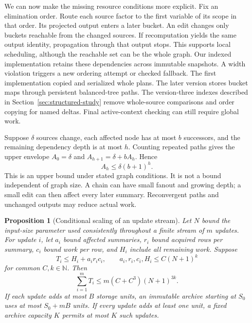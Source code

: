 \documentclass[11pt,a4paper]{article}
\numberwithin{equation}{section}
\theoremstyle{plain}
\newtheorem{proposition}[lemma]{Proposition}
\theoremstyle{definition}
\theoremstyle{remark}
\begin{document}
We can now make the missing resource conditions more explicit. Fix an elimination order. Route each source factor to the first variable of its scope in that order. Its projected output enters a later bucket. An edit changes only buckets reachable from the changed sources. If recomputation yields the same output identity, propagation through that output stops. This supports local scheduling, although the reachable set can be the whole graph. Our indexed implementation retains these dependencies across immutable snapshots. A width violation triggers a new ordering attempt or checked fallback. The first implementation copied and serialized whole plans. The later version stores bucket maps through persistent balanced-tree paths. The version-three indexes described in Section~\ref{sec:structured-study} remove whole-source comparisons and order copying for named deltas. Final active-context checking can still require global work.

Suppose $\delta$ sources change, each affected node has at most $b$ successors, and the remaining dependency depth is at most $h$. Counting repeated paths gives the upper envelope $A_0=\delta$ and $A_{h+1}=\delta+bA_h$. Hence
\begin{equation}
A_h\leq\delta(b+1)^h.
\label{eq:affected-envelope}
\end{equation}
This is an upper bound under stated graph conditions. It is not a bound independent of graph size. A chain can have small fanout and growing depth; a small edit can then affect every later summary. Reconvergent paths and unchanged outputs may reduce actual work.

\begin{proposition}[Conditional scaling of an update stream]
\label{prop:conditional-update}
Let $N$ bound the input-size parameter used consistently throughout a finite stream of $m$ updates. For update $i$, let $a_i$ bound affected summaries, $r_i$ bound acquired rows per summary, $c_i$ bound work per row, and $H_i$ include all remaining work. Suppose
\begin{equation}
T_i\leq H_i+a_i r_i c_i,
\qquad a_i,r_i,c_i,H_i\leq C(N+1)^k
\label{eq:conditional-update-premises}
\end{equation}
for common $C,k\in\mathbb N$. Then
\begin{equation}
\sum_{i=1}^{m}T_i\leq m(C+C^3)(N+1)^{3k}.
\label{eq:conditional-update-bound}
\end{equation}
If each update adds at most $B$ storage units, an immutable archive starting at $S_0$ uses at most $S_0+mB$ units. If every update adds at least one unit, a fixed archive capacity $K$ permits at most $K$ such updates.
\end{proposition}
\end{document}
